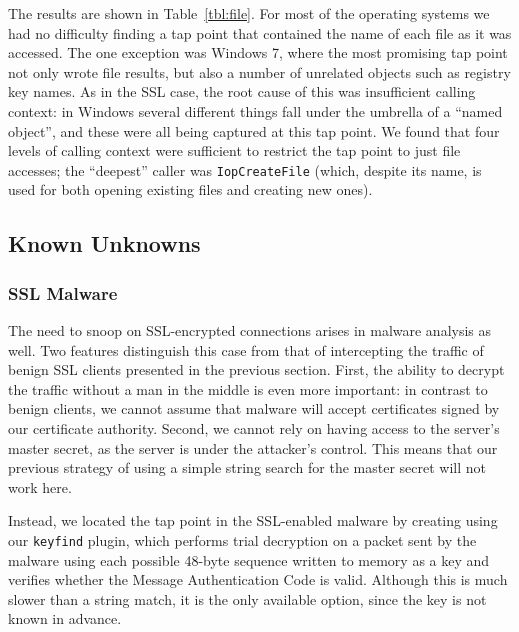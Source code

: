 The results are shown in Table~\ref{tbl:file}. For most of the operating
systems we had no difficulty finding a tap point that contained the name
of each file as it was accessed. The one exception was Windows 7, where
the most promising tap point not only wrote file results, but also a
number of unrelated objects such as registry key names. As in the SSL
case, the root cause of this was insufficient calling context: in
Windows several different things fall under the umbrella of a ``named
object'', and these were all being captured at this tap point. We found
that four levels of calling context were sufficient to restrict the tap
point to just file accesses; the ``deepest'' caller was
\texttt{IopCreateFile} (which, despite its name, is used for both
opening existing files and creating new ones).

\subsection{Known Unknowns}
\subsubsection{SSL Malware}
\label{sec:eval:subsec:sslmal}

The need to snoop on SSL-encrypted connections arises in malware
analysis as well. Two features distinguish this case from that of
intercepting the traffic of benign SSL clients presented in the previous
section. First, the ability to decrypt the traffic without a man in the
middle is even more important: in contrast to benign clients, we cannot
assume that malware will accept certificates signed by our certificate
authority. Second, we cannot rely on having access to the server's
master secret, as the server is under the attacker's control. This means
that our previous strategy of using a simple string search for the
master secret will not work here.

Instead, we located the tap point in the SSL-enabled malware by creating
using our \texttt{keyfind} plugin, which performs trial decryption on a
packet sent by the malware using each possible 48-byte sequence written
to memory as a key and verifies whether the Message Authentication Code
is valid. Although this is much slower than a string match, it is the
only available option, since the key is not known in advance.

